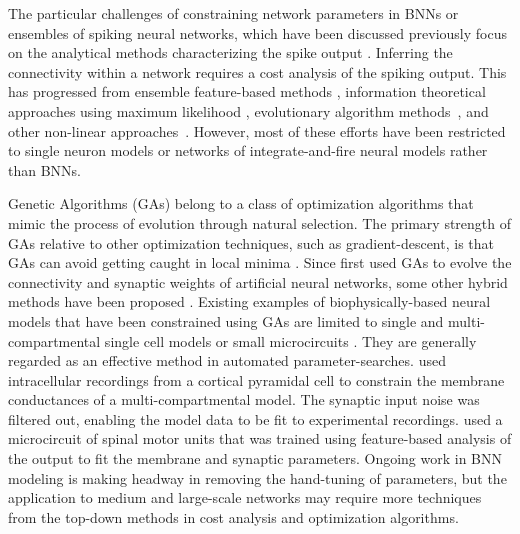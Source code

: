 \smallskip{} 

The particular challenges of constraining network parameters in BNNs
or ensembles of spiking neural networks, which have been discussed
previously \citep{EggertHemmen:2001,Brette:2007} focus on the
analytical methods characterizing the spike output
\citep{Victor:2005,KostalLanskyEtAl:2007,BrownKassEtAl:2004}. Inferring
the connectivity within a network requires a cost analysis of the
spiking output.  This has progressed from ensemble feature-based
methods
\citep{SameshimaBaccala:1999,DahlhausEichlerEtAl:1997,TheunissenSenEtAl:2000},
information theoretical approaches using maximum likelihood
\citep{YamadaMatsumotoEtAl:1996,Chichilnisky:2001,OkatanWilsonEtAl:2005,PaninskiPillowEtAl:2004},
evolutionary algorithm methods~\citep{TakahamaSakai:2005,Yao:1999},
and other non-linear approaches~\citep{Eblen-ZajjurSalasEtAl:1999}.
However, most of these efforts have been restricted to single neuron
models or networks of integrate-and-fire neural models rather than
BNNs.

\smallskip{} 

Genetic Algorithms (GAs) belong to a class of optimization algorithms
that mimic the process of evolution through natural selection. The
primary strength of GAs relative to other optimization techniques,
such as gradient-descent, is that GAs can avoid getting caught in
local minima \citep{Goldberg:1989,Whitley:1995}. Since
\citet{Holland:1975} first used GAs to evolve the connectivity and
synaptic weights of artificial neural networks, some other hybrid
methods have been proposed \citep{Yao:1999,Whitley:1995}. Existing
examples of biophysically-based neural models that have been
constrained using GAs are limited to single and multi-compartmental
single cell models
\citep{KerenPeledEtAl:2005,VanierBower:1999,VanDeEtAl:2008} or small
microcircuits \citep{TaylorEnoka:2004}.  They are generally regarded
as an effective method in automated
parameter-searches. \citet{KerenPeledEtAl:2005} used intracellular
recordings from a cortical pyramidal cell to constrain the membrane
conductances of a multi-compartmental model.  The synaptic input noise
was filtered out, enabling the model data to be fit to experimental
recordings. \citet{TaylorEnoka:2004} used a microcircuit of spinal
motor units that was trained using feature-based analysis of the
output to fit the membrane and synaptic parameters.  Ongoing work in
BNN modeling \citep{VanierBower:1999,VanDeEtAl:2008} is making headway
in removing the hand-tuning of parameters, but the application to
medium and large-scale networks may require more techniques from the
top-down methods in cost analysis and optimization algorithms.

